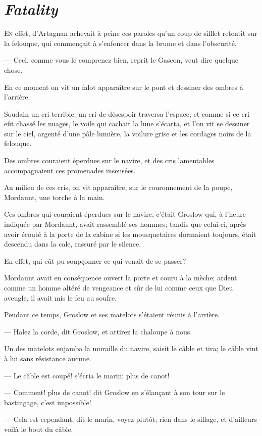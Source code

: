 \chapter{\emph{Fatality}}

\lettrine{E}{n} effet, d'Artagnan achevait à peine ces paroles qu'un coup de sifflet retentit sur la felouque, qui commençait à s'enfoncer dans la brume et dans l'obscurité.

\zz
— Ceci, comme vous le comprenez bien, reprit le Gascon, veut dire quelque chose.

En ce moment on vit un falot apparaître sur le pont et dessiner des ombres à l'arrière.

Soudain un cri terrible, un cri de désespoir traversa l'espace; et comme si ce cri eût chassé les nuages, le voile qui cachait la lune s'écarta, et l'on vit se dessiner sur le ciel, argenté d'une pâle lumière, la voilure grise et les cordages noirs de la felouque.

Des ombres couraient éperdues sur le navire, et des cris lamentables accompagnaient ces promenades insensées.

Au milieu de ces cris, on vit apparaître, sur le couronnement de la poupe, Mordaunt, une torche à la main.

Ces ombres qui couraient éperdues sur le navire, c'était Groslow qui, à l'heure indiquée par Mordaunt, avait rassemblé ses hommes; tandis que celui-ci, après avoir écouté à la porte de la cabine si les mousquetaires dormaient toujours, était descendu dans la cale, rassuré par le silence.

En effet, qui eût pu soupçonner ce qui venait de se passer?

Mordaunt avait en conséquence ouvert la porte et couru à la mèche; ardent comme un homme altéré de vengeance et sûr de lui comme ceux que Dieu aveugle, il avait mis le feu au soufre.

Pendant ce temps, Groslow et ses matelots s'étaient réunis à l'arrière.

— Halez la corde, dit Groslow, et attirez la chaloupe à nous.

Un des matelots enjamba la muraille du navire, saisit le câble et tira; le câble vint à lui sans résistance aucune.

— Le câble est coupé! s'écria le marin: plus de canot!

— Comment! plus de canot! dit Groslow en s'élançant à son tour sur le bastingage, c'est impossible!

— Cela est cependant, dit le marin, voyez plutôt; rien dans le sillage, et d'ailleurs voilà le bout du câble.


